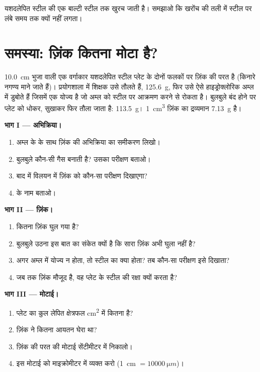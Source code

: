 \begin{exercise}[$\star\star\star$]\label{exo:g9:metals-acids-corrosion:12}
यशदलेपित स्टील की एक बाल्टी स्टील तक खुरच जाती है। समझाओ कि खरोंच की तली
में स्टील पर लंबे समय तक  क्यों नहीं लगता।
\end{exercise}

\section{समस्या: ज़िंक कितना मोटा है?}

\begin{problem}
\label{pb:g9:metals-acids-corrosion:1}
\qty{10.0}{cm} भुजा वाली एक वर्गाकार यशदलेपित स्टील प्लेट के दोनों फलकों पर
ज़िंक की परत है (किनारे नगण्य माने जाते हैं)। प्रयोगशाला में शिक्षक
उसे तौलते हैं, \qty{125.6}{g}, फिर उसे ऐसे हाइड्रोक्लोरिक अम्ल में डुबोते हैं
जिसमें एक योज्य है जो अम्ल को स्टील पर आक्रमण करने से रोकता है। बुलबुले
बंद होने पर प्लेट को धोकर, सुखाकर फिर तौला जाता है: \qty{113.5}{g}।
\qty{1}{cm^3} ज़िंक का द्रव्यमान \qty{7.13}{g} है।

\medskip
\noindent\textbf{भाग I --- अभिक्रिया।}
\begin{enumerate}
  \item अम्ल के   के साथ ज़िंक की अभिक्रिया का समीकरण
        लिखो।
  \item बुलबुले कौन-सी गैस बनाती है? उसका परीक्षण बताओ।
  \item बाद में विलयन में ज़िंक  को कौन-सा परीक्षण दिखाएगा?
  \item {} के नाम बताओ।
\end{enumerate}

\medskip
\noindent\textbf{भाग II --- ज़िंक।}
\begin{enumerate}[resume]
  \item कितना ज़िंक घुल गया है?
  \item बुलबुले उठना इस बात का संकेत क्यों है कि सारा ज़िंक अभी घुला
        नहीं है?
  \item अगर अम्ल में योज्य न होता, तो स्टील का क्या होता? तब कौन-सा परीक्षण
        इसे दिखाता?
  \item जब तक ज़िंक मौजूद है, वह प्लेट के स्टील की रक्षा क्यों करता
        है?
\end{enumerate}

\medskip
\noindent\textbf{भाग III --- मोटाई।}
\begin{enumerate}[resume]
  \item प्लेट का कुल लेपित क्षेत्रफल \unit{cm^2} में कितना है?
  \item ज़िंक ने कितना आयतन घेरा था?
  \item ज़िंक की परत की मोटाई सेंटीमीटर में निकालो।
  \item इस मोटाई को माइक्रोमीटर में व्यक्त करो
        (\qty{1}{cm} $= \qty{10000}{\micro m}$)।
\end{enumerate}
\end{problem}
